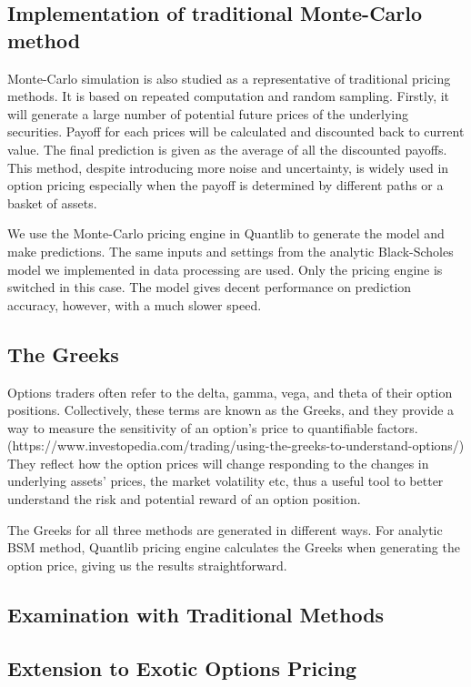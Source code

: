 \documentclass{report}
\begin{document}
\subsection{Implementation of  traditional Monte-Carlo method}
Monte-Carlo simulation is also studied as a representative of traditional pricing methods. It is based on repeated computation and random sampling. Firstly, it will generate a large number of potential future prices of the underlying securities. Payoff for each prices will be calculated and discounted back to current value. The final prediction is given as the average of all the discounted payoffs. This method, despite introducing more noise and uncertainty,  is widely used in option pricing especially when the payoff is determined by different paths or a basket of assets. 

We use the Monte-Carlo pricing engine in Quantlib to generate the model and make predictions.  The same inputs and settings from the analytic Black-Scholes model we implemented in data processing are used. Only the pricing engine is switched in this case. The model gives decent performance on prediction accuracy, however, with a much slower speed.

\subsection{The Greeks}

Options traders often refer to the delta, gamma, vega, and theta of their option positions. Collectively, these terms are known as the Greeks, and they provide a way to measure the sensitivity of an option's price to quantifiable factors. (https://www.investopedia.com/trading/using-the-greeks-to-understand-options/) They reflect how the option prices will change responding to the changes in underlying assets' prices, the market volatility etc, thus a useful tool to better understand the risk and potential reward of an option position. 

The Greeks for all three methods are generated in different ways. For analytic BSM method, Quantlib pricing engine calculates the Greeks when generating the option price,  giving us the results straightforward. 
\subsection{Examination with Traditional Methods}
\subsection{Extension to Exotic Options Pricing}
\end{document}
